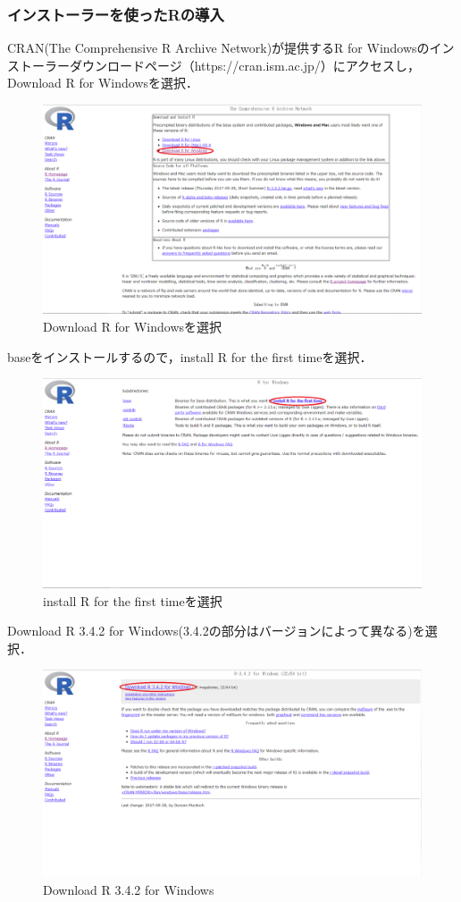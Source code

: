 \subsubsection{インストーラーを使ったRの導入}
CRAN(The Comprehensive R Archive Network)が提供するR for Windowsのインストーラーダウンロードページ（https://cran.ism.ac.jp/）にアクセスし，Download R for Windowsを選択．
\begin{figure}[h]
\centering
\includegraphics[width=13cm,clip]{Rdown1.PNG}
\caption{Download R for Windowsを選択}
\end{figure}
\newpage
baseをインストールするので，install R for the first timeを選択．
\begin{figure}[h]
\centering
\includegraphics[width=13cm,clip]{Rdown2.PNG}
\caption{install R for the first timeを選択}
\end{figure}
\newpage
Download R 3.4.2 for Windows(3.4.2の部分はバージョンによって異なる)を選択．
\begin{figure}[h]
\centering
\includegraphics[width=13cm,clip]{Rdown3.PNG}
\caption{Download R 3.4.2 for Windows}
\end{figure}
\newpage

